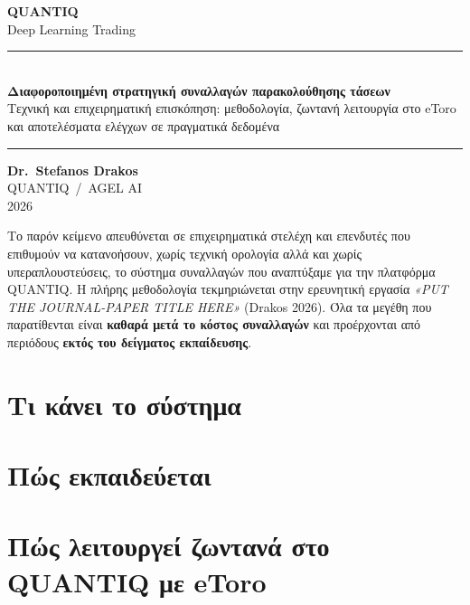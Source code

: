 \documentclass[11pt]{article}
\newcommand{\modeltitle}{Διαφοροποιημένη στρατηγική συναλλαγών παρακολούθησης τάσεων}
\newcommand{\modelsubtitle}{Τεχνική και επιχειρηματική επισκόπηση: μεθοδολογία, ζωντανή λειτουργία στο eToro και αποτελέσματα ελέγχων σε πραγματικά δεδομένα}
\newcommand{\papertitle}{\emph{«PUT THE JOURNAL-PAPER TITLE HERE»} (Drakos 2026)}
\newcommand{\reportdate}{2026}
\begin{document}
\begin{titlepage}\centering\thispagestyle{empty}
\vspace*{3.2cm}
{\sffamily\bfseries\fontsize{52}{56}\selectfont QUANTIQ}\\[14pt]
{\sffamily\fontsize{22}{26}\selectfont\color{accent} Deep Learning Trading}\\[3.4cm]
\rule{0.66\linewidth}{0.4pt}\\[18pt]
{\large\bfseries \modeltitle}\\[8pt]
{\normalsize \modelsubtitle}\\[14pt]
\rule{0.66\linewidth}{0.4pt}
\vfill
{\large\bfseries Dr.\ Stefanos Drakos}\\[5pt]
{\normalsize QUANTIQ \,/\, AGEL AI}\\[3pt]
{\small \reportdate}
\end{titlepage}

\noindent
Το παρόν κείμενο απευθύνεται σε επιχειρηματικά στελέχη και επενδυτές που επιθυμούν να κατανοήσουν,
χωρίς τεχνική ορολογία αλλά και χωρίς υπεραπλουστεύσεις, το σύστημα συναλλαγών που αναπτύξαμε για την
πλατφόρμα QUANTIQ. %
Η πλήρης μεθοδολογία τεκμηριώνεται στην ερευνητική εργασία \papertitle. Όλα τα μεγέθη που
παρατίθενται είναι \textbf{καθαρά μετά το κόστος συναλλαγών} και προέρχονται από περιόδους
\textbf{εκτός του δείγματος εκπαίδευσης}.

\section{Τι κάνει το σύστημα}

\section{Πώς εκπαιδεύεται}

\section{Πώς λειτουργεί ζωντανά στο QUANTIQ με eToro}
\end{document}
